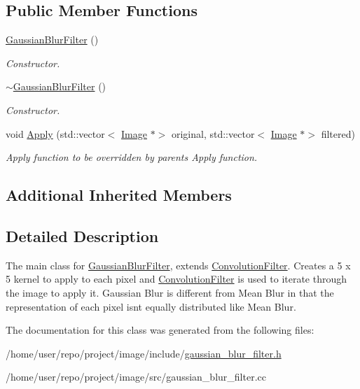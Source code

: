 \subsection*{Public Member Functions}
\begin{DoxyCompactItemize}
\item 
\mbox{\label{classGaussianBlurFilter_a5b073291df50d87077650371c90af0f9}} 
\hyperlink{classGaussianBlurFilter_a5b073291df50d87077650371c90af0f9}{Gaussian\+Blur\+Filter} ()
\begin{DoxyCompactList}\small\item\em Constructor. \end{DoxyCompactList}\item 
\mbox{\label{classGaussianBlurFilter_a371400ed538c678311cc950f8eaa5218}} 
\hyperlink{classGaussianBlurFilter_a371400ed538c678311cc950f8eaa5218}{$\sim$\+Gaussian\+Blur\+Filter} ()
\begin{DoxyCompactList}\small\item\em Constructor. \end{DoxyCompactList}\item 
\mbox{\label{classGaussianBlurFilter_a8260deac8ea6cda8e473bc6da0846bff}} 
void \hyperlink{classGaussianBlurFilter_a8260deac8ea6cda8e473bc6da0846bff}{Apply} (std\+::vector$<$ \hyperlink{classImage}{Image} $\ast$$>$ original, std\+::vector$<$ \hyperlink{classImage}{Image} $\ast$$>$ filtered)
\begin{DoxyCompactList}\small\item\em Apply function to be overridden by parents Apply function. \end{DoxyCompactList}\end{DoxyCompactItemize}
\subsection*{Additional Inherited Members}


\subsection{Detailed Description}
The main class for \hyperlink{classGaussianBlurFilter}{Gaussian\+Blur\+Filter}, extends \hyperlink{classConvolutionFilter}{Convolution\+Filter}. Creates a 5 x 5 kernel to apply to each pixel and \hyperlink{classConvolutionFilter}{Convolution\+Filter} is used to iterate through the image to apply it. Gaussian Blur is different from Mean Blur in that the representation of each pixel isn\textquotesingle{}t equally distributed like Mean Blur. 

The documentation for this class was generated from the following files\+:\begin{DoxyCompactItemize}
\item 
/home/user/repo/project/image/include/\hyperlink{gaussian__blur__filter_8h}{gaussian\+\_\+blur\+\_\+filter.\+h}\item 
/home/user/repo/project/image/src/gaussian\+\_\+blur\+\_\+filter.\+cc\end{DoxyCompactItemize}
